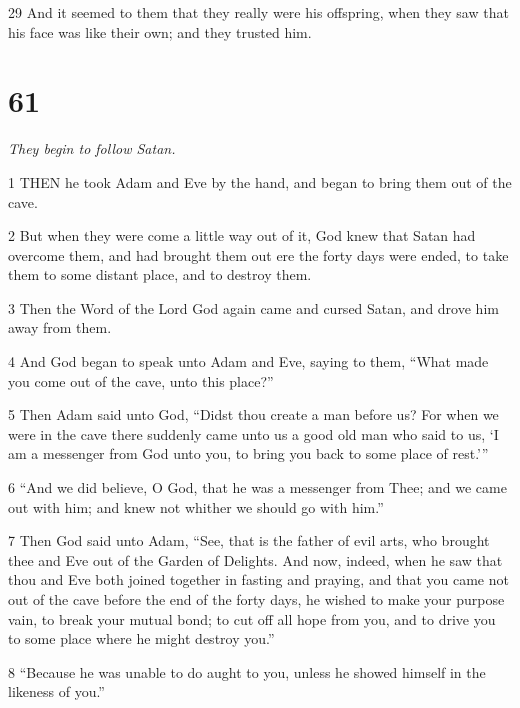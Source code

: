 \par 29 And it seemed to them that they really were his offspring, when they saw that his face was like their own; and they trusted him.

\chapter{61}

\par \textit{They begin to follow Satan.}

\par 1 THEN he took Adam and Eve by the hand, and began to bring them out of the cave.

\par 2 But when they were come a little way out of it, God knew that Satan had overcome them, and had brought them out ere the forty days were ended, to take them to some distant place, and to destroy them.

\par 3 Then the Word of the Lord God again came and cursed Satan, and drove him away from them.

\par 4 And God began to speak unto Adam and Eve, saying to them, “What made you come out of the cave, unto this place?”

\par 5 Then Adam said unto God, “Didst thou create a man before us? For when we were in the cave there suddenly came unto us a good old man who said to us, ‘I am a messenger from God unto you, to bring you back to some place of rest.’”

\par 6 “And we did believe, O God, that he was a messenger from Thee; and we came out with him; and knew not whither we should go with him.”

\par 7 Then God said unto Adam, “See, that is the father of evil arts, who brought thee and Eve out of the Garden of Delights. And now, indeed, when he saw that thou and Eve both joined together in fasting and praying, and that you came not out of the cave before the end of the forty days, he wished to make your purpose vain, to break your mutual bond; to cut off all hope from you, and to drive you to some place where he might destroy you.”

\par 8 “Because he was unable to do aught to you, unless he showed himself in the likeness of you.”

